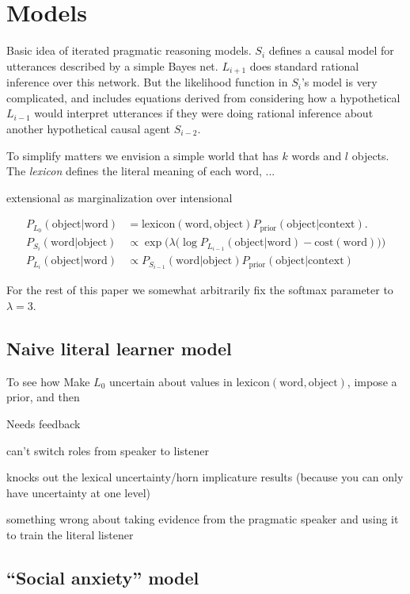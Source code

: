 \documentclass{article} %
\begin{document}
\section{Models}

Basic idea of iterated pragmatic reasoning models. $S_i$ defines a causal model for utterances described by a simple Bayes net. $L_{i+1}$ does standard rational inference over this network. But the likelihood function in $S_i$'s model is very complicated, and includes equations derived from considering how a hypothetical $L_{i-1}$ would interpret utterances if they were doing rational inference about another hypothetical causal agent $S_{i-2}$.

To simplify matters we envision a simple world that has $k$ words and $l$ objects. The \textit{lexicon} defines the literal meaning of each word, ...

extensional as marginalization over intensional

\newcommand{\word}{\text{word}}
\newcommand{\obj}{\text{object}}
\begin{align*}
P_{L_0}(\obj | \word) &= \text{lexicon}(\word, \obj) P_{\text{prior}}(\obj | \text{context}). \\
P_{S_i}(\word | \obj) &\propto \exp\Big(\lambda \big(\log P_{L_{i - 1}}(\obj | \word) - \text{cost}(\word)\big)\Big) \\
P_{L_i}(\obj | \word) &\propto P_{S_{i-1}}(\word | \obj) P_{\text{prior}}(\obj | \text{context})
\end{align*}

For the rest of this paper we somewhat arbitrarily fix the softmax parameter to $\lambda = 3$.

\subsection{Naive literal learner model}

To see how
Make $L_0$ uncertain about values in $\text{lexicon}(\word, \obj)$, impose a prior, and then

Needs feedback

can't switch roles from speaker to listener

knocks out the lexical uncertainty/horn implicature results (because you can only have uncertainty at one level)

something wrong about taking evidence from the pragmatic speaker and using it to train the literal listener

\subsection{``Social anxiety'' model}
\end{document}
